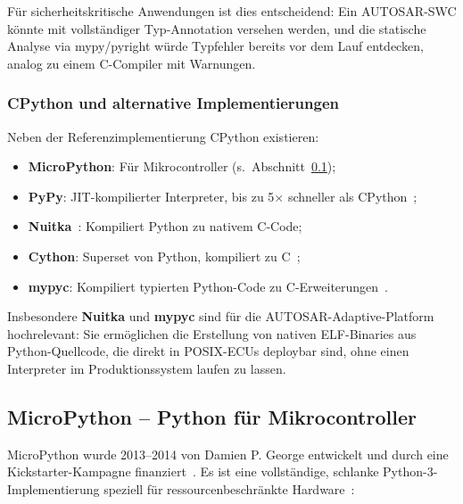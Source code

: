 ﻿\documentclass[12pt,a4paper,twoside]{article}
\begin{document}
Für sicherheitskritische Anwendungen ist dies entscheidend:
Ein AUTOSAR-SWC könnte mit vollständiger Typ-Annotation versehen werden,
und die statische Analyse via mypy/pyright würde Typfehler bereits
vor dem Lauf entdecken, analog zu einem C-Compiler mit Warnungen.

\subsubsection{CPython und alternative Implementierungen}
Neben der Referenzimplementierung CPython existieren:
\begin{itemize}
  \item \textbf{MicroPython}: Für Mikrocontroller (s.\ Abschnitt~\ref{subsec:micropython});
  \item \textbf{PyPy}: JIT-kompilierter Interpreter, bis zu 5$\times$ schneller als CPython~\cite{pypy_bolz2009};
  \item \textbf{Nuitka}~\cite{nuitka}: Kompiliert Python zu nativem C-Code;
  \item \textbf{Cython}: Superset von Python, kompiliert zu C~\cite{cython_book};
  \item \textbf{mypyc}: Kompiliert typierten Python-Code zu C-Erweiterungen~\cite{mypyc2022}.
\end{itemize}

Insbesondere \textbf{Nuitka} und \textbf{mypyc} sind für die AUTOSAR-Adaptive-Platform
hochrelevant: Sie ermöglichen die Erstellung von nativen ELF-Binaries aus
Python-Quellcode, die direkt in POSIX-ECUs deploybar sind, ohne
einen Interpreter im Produktionssystem laufen zu lassen.

\subsection{MicroPython -- Python für Mikrocontroller}
\label{subsec:micropython}

MicroPython wurde 2013--2014 von Damien P. George entwickelt und
durch eine Kickstarter-Kampagne finanziert~\cite{george2014micropython}.
Es ist eine vollständige, schlanke Python-3-Implementierung
speziell für ressourcenbeschränkte Hardware~\cite{micropython_main}:
\end{document}
